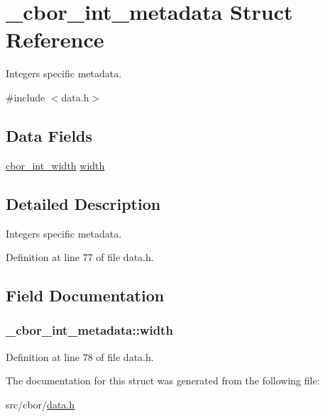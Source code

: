 \hypertarget{struct__cbor__int__metadata}{\section{\-\_\-cbor\-\_\-int\-\_\-metadata Struct Reference}
\label{struct__cbor__int__metadata}
}


Integers specific metadata.  




{\ttfamily \#include $<$data.\-h$>$}

\subsection*{Data Fields}
\begin{DoxyCompactItemize}
\item 
\hyperlink{data_8h_ae0fc9740f108f0f0078b93712b061e57}{cbor\-\_\-int\-\_\-width} \hyperlink{struct__cbor__int__metadata_a7a402d748e607c9942e5eefdb875582d}{width}
\end{DoxyCompactItemize}


\subsection{Detailed Description}
Integers specific metadata. 

Definition at line 77 of file data.\-h.



\subsection{Field Documentation}
\hypertarget{struct__cbor__int__metadata_a7a402d748e607c9942e5eefdb875582d}{
\subsubsection[{width}]{ \-\_\-cbor\-\_\-int\-\_\-metadata\-::width}}\label{struct__cbor__int__metadata_a7a402d748e607c9942e5eefdb875582d}


Definition at line 78 of file data.\-h.



The documentation for this struct was generated from the following file\-:\begin{DoxyCompactItemize}
\item 
src/cbor/\hyperlink{data_8h}{data.\-h}\end{DoxyCompactItemize}
